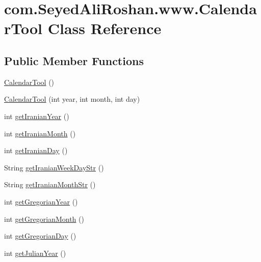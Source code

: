 \hypertarget{classcom_1_1_seyed_ali_roshan_1_1www_1_1_calendar_tool}{}\section{com.\+Seyed\+Ali\+Roshan.\+www.\+Calendar\+Tool Class Reference}
\label{classcom_1_1_seyed_ali_roshan_1_1www_1_1_calendar_tool}
\subsection*{Public Member Functions}
\begin{DoxyCompactItemize}
\item 
\hyperlink{classcom_1_1_seyed_ali_roshan_1_1www_1_1_calendar_tool_a5bac292bba8e7a28dcdafe093072763a}{Calendar\+Tool} ()
\item 
\hyperlink{classcom_1_1_seyed_ali_roshan_1_1www_1_1_calendar_tool_a4cd03f8f1a3580a0a8d1fb56b535c028}{Calendar\+Tool} (int year, int month, int day)
\item 
int \hyperlink{classcom_1_1_seyed_ali_roshan_1_1www_1_1_calendar_tool_a032e77ba430be265ff9d55805237be5e}{get\+Iranian\+Year} ()
\item 
int \hyperlink{classcom_1_1_seyed_ali_roshan_1_1www_1_1_calendar_tool_ae9011cd29c301785e51037c704bd6ee4}{get\+Iranian\+Month} ()
\item 
int \hyperlink{classcom_1_1_seyed_ali_roshan_1_1www_1_1_calendar_tool_adc0f3121df6416309d8837cfc2b3ef0c}{get\+Iranian\+Day} ()
\item 
String \hyperlink{classcom_1_1_seyed_ali_roshan_1_1www_1_1_calendar_tool_a369f2b171ef0b5acfe4fb102033a87d4}{get\+Iranian\+Week\+Day\+Str} ()
\item 
String \hyperlink{classcom_1_1_seyed_ali_roshan_1_1www_1_1_calendar_tool_a6f594c497638e8ab22b843429cd0c33c}{get\+Iranian\+Month\+Str} ()
\item 
int \hyperlink{classcom_1_1_seyed_ali_roshan_1_1www_1_1_calendar_tool_a75bd27aa8e56ff610fb24c5d8875f675}{get\+Gregorian\+Year} ()
\item 
int \hyperlink{classcom_1_1_seyed_ali_roshan_1_1www_1_1_calendar_tool_a35f24d4098f8fdb9ce1134267679b007}{get\+Gregorian\+Month} ()
\item 
int \hyperlink{classcom_1_1_seyed_ali_roshan_1_1www_1_1_calendar_tool_a0f4bcde4f5df18120510c9db1d0bcd85}{get\+Gregorian\+Day} ()
\item 
int \hyperlink{classcom_1_1_seyed_ali_roshan_1_1www_1_1_calendar_tool_a61e6dae7e20420b13cd99871d3ec83cd}{get\+Julian\+Year} ()

\end{DoxyCompactItemize}
